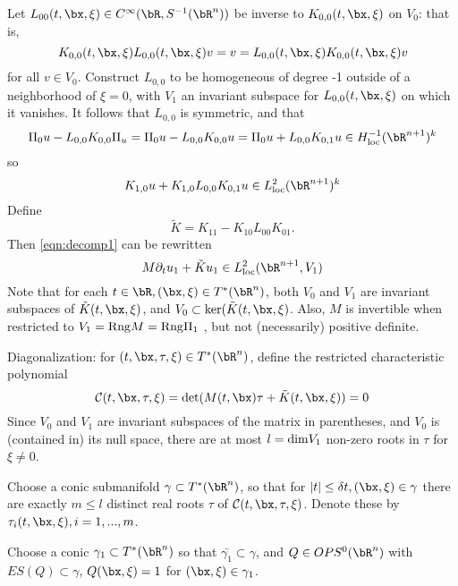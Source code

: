 
Let  $L_{00}(t,\bx,\xi) \in C^{\infty}(\bR, S^{-1}(\bR^n))$ be inverse to $K_{0,0}(t,\bx,\xi)$ on $V_0$: that is,
\[
  K_{0,0}(t,\bx,\xi)L_{0,0}(t,\bx,\xi) v=v=L_{0,0}(t,\bx,\xi)K_{0,0}(t,\bx,\xi)v
\]
for all $v \in V_0$. Construct $L_{0,0}$ to be homogeneous of degree -1 outside of a neighborhood of $\xi=0$, with $V_1$ an invariant subspace for $L_{0,0}(t,\bx,\xi)$ on which it vanishes. It follows that $L_{0,0}$ is symmetric, and that
\[
  \Pi_0 u - L_{0,0}K_{0,0}\Pi_u = \Pi_0 u - L_{0,0}K_{0,0}u = \Pi_0 u + L_{0,0}K_{0,1}u \in H^{-1}_{\rm loc}(\bR^{n+1})^k
\]
so
\[
  K_{1,0}u + K_{1,0}L_{0,0}K_{0,1}u \in L^2 _{\rm loc}(\bR^{n+1})^k
\]
Define
\[
  \tilde{K} = K_{11} - K_{10}L_{00}K_{01}.
\]
Then \ref{eqn:decomp1} can be rewritten
\begin{equation}
  \label{eqn:shs1}
  M\partial_t u_1 + \tilde{K}u_1 \in L^2_{\rm loc}(\bR^{n+1},V_1)
\end{equation}
Note that for each $t \in \bR, (\bx,\xi) \in T^*(\bR^n)$, both $V_0$ and $V_1$ are invariant subspaces of $\tilde{K}(t,\bx,\xi)$, and $V_0 \subset {\rm ker}(\tilde{K}(t,\bx,\xi)$. Also, $M$ is invertible when restricted to $V_1 = {\rm Rng} M = {\rm Rng } \Pi_1$ , but not (necessarily) positive definite.
  
Diagonalization: for $(t,\bx,\tau,\xi) \in T^*(\bR^n)$, define the restricted characteristic polynomial
\[
  {\cal C}(t,\bx,\tau,\xi) = \det (M(t,\bx)\tau + \tilde{K}(t,\bx,\xi) )= 0
\]
Since $V_0$ and $V_1$ are invariant subspaces of the matrix in parentheses, and $V_0$ is (contained in) its null space, there are at most $l={\rm dim}V_1$ non-zero roots in $\tau$ for $\xi \ne 0$.

Choose a conic submanifold $\gamma \subset T^*(\bR^n)$, so that for $|t| \le \delta t, (\bx,\xi) \in \gamma$ there are exactly $m \le l$ distinct real roots $\tau$ of ${\cal C}(t,\bx,\tau,\xi)$. Denote these by $\tau_i(t,\bx,\xi), i=1,...,m$.

Choose a conic $\gamma_1 \subset T^*(\bR^n)$ so that $\bar{\gamma_1} \subset \gamma$, and $Q \in OPS^0(\bR^n)$ with $ES(Q) \subset \gamma$, $Q(\bx,\xi) =1$ for $(\bx,\xi)\in \gamma_1$.

